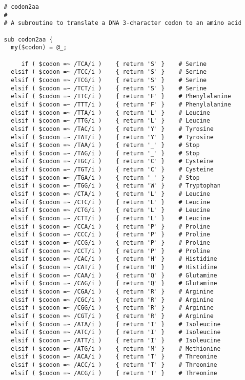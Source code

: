 \begin{lstlisting}
# codon2aa
#
# A subroutine to translate a DNA 3-character codon to an amino acid

sub codon2aa {
  my($codon) = @_;
    
     if ( $codon =~ /TCA/i )    { return 'S' }    # Serine
  elsif ( $codon =~ /TCC/i )    { return 'S' }    # Serine
  elsif ( $codon =~ /TCG/i )    { return 'S' }    # Serine
  elsif ( $codon =~ /TCT/i )    { return 'S' }    # Serine
  elsif ( $codon =~ /TTC/i )    { return 'F' }    # Phenylalanine
  elsif ( $codon =~ /TTT/i )    { return 'F' }    # Phenylalanine
  elsif ( $codon =~ /TTA/i )    { return 'L' }    # Leucine
  elsif ( $codon =~ /TTG/i )    { return 'L' }    # Leucine
  elsif ( $codon =~ /TAC/i )    { return 'Y' }    # Tyrosine
  elsif ( $codon =~ /TAT/i )    { return 'Y' }    # Tyrosine
  elsif ( $codon =~ /TAA/i )    { return '_' }    # Stop
  elsif ( $codon =~ /TAG/i )    { return '_' }    # Stop
  elsif ( $codon =~ /TGC/i )    { return 'C' }    # Cysteine
  elsif ( $codon =~ /TGT/i )    { return 'C' }    # Cysteine
  elsif ( $codon =~ /TGA/i )    { return '_' }    # Stop
  elsif ( $codon =~ /TGG/i )    { return 'W' }    # Tryptophan
  elsif ( $codon =~ /CTA/i )    { return 'L' }    # Leucine
  elsif ( $codon =~ /CTC/i )    { return 'L' }    # Leucine
  elsif ( $codon =~ /CTG/i )    { return 'L' }    # Leucine
  elsif ( $codon =~ /CTT/i )    { return 'L' }    # Leucine
  elsif ( $codon =~ /CCA/i )    { return 'P' }    # Proline
  elsif ( $codon =~ /CCC/i )    { return 'P' }    # Proline
  elsif ( $codon =~ /CCG/i )    { return 'P' }    # Proline
  elsif ( $codon =~ /CCT/i )    { return 'P' }    # Proline
  elsif ( $codon =~ /CAC/i )    { return 'H' }    # Histidine
  elsif ( $codon =~ /CAT/i )    { return 'H' }    # Histidine
  elsif ( $codon =~ /CAA/i )    { return 'Q' }    # Glutamine
  elsif ( $codon =~ /CAG/i )    { return 'Q' }    # Glutamine
  elsif ( $codon =~ /CGA/i )    { return 'R' }    # Arginine
  elsif ( $codon =~ /CGC/i )    { return 'R' }    # Arginine
  elsif ( $codon =~ /CGG/i )    { return 'R' }    # Arginine
  elsif ( $codon =~ /CGT/i )    { return 'R' }    # Arginine
  elsif ( $codon =~ /ATA/i )    { return 'I' }    # Isoleucine
  elsif ( $codon =~ /ATC/i )    { return 'I' }    # Isoleucine
  elsif ( $codon =~ /ATT/i )    { return 'I' }    # Isoleucine
  elsif ( $codon =~ /ATG/i )    { return 'M' }    # Methionine
  elsif ( $codon =~ /ACA/i )    { return 'T' }    # Threonine
  elsif ( $codon =~ /ACC/i )    { return 'T' }    # Threonine
  elsif ( $codon =~ /ACG/i )    { return 'T' }    # Threonine

\end{lstlisting}
